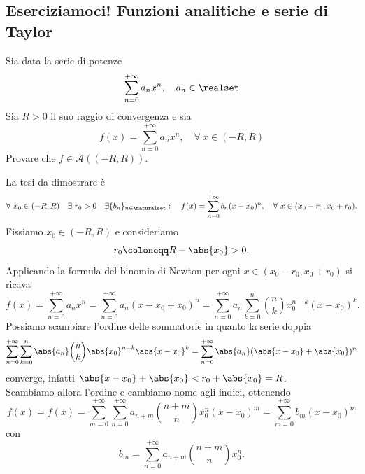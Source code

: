 \subsection{Eserciziamoci! Funzioni analitiche e serie di Taylor}
\begin{exercise}
Sia data la serie di potenze
\begin{equation*}
	\sum_{n=0}^{+\infty} a_n x^n, \quad a_n\in \realset
\end{equation*}
Sia $R>0$ il suo raggio di convergenza e sia
\begin{equation*}
	f(x)=\sum_{n=0}^{+\infty} a_n x^n, \quad \forall \ x\in (-R,R)
\end{equation*}	
Provare che $f\in \mathcal{A}((-R,R))$.
\end{exercise}
\begin{solution}
	La tesi da dimostrare è
	\begin{equation*}
		\forall \ x_0\in (-R,R) \quad \exists \ r_0>0\quad \exists \{b_n\}_{n\in \naturalset}: \quad f(x)=\sum_{n=0}^{+\infty} b_n (x-x_0)^n,\quad \forall \ x\in (x_0-r_0,x_0+r_0).
	\end{equation*}
Fissiamo $x_0\in\left(-R,R\right)$ e consideriamo
\begin{equation*}
	r_0\coloneqq R-\abs{x_0}>0.
\end{equation*}
Applicando la formula del binomio di Newton per ogni $x\in \left(x_0-r_0,x_0+r_0\right)$ si ricava
\begin{equation*}
	f(x)=\sum_{n=0}^{+\infty} a_n x^n=\sum_{n=0}^{+\infty} a_n (x-x_0+x_0)^n = \sum_{n=0}^{+\infty} a_n \sum_{k=0}^{n} \binom{n}{k} x_0^{n-k} (x-x_0)^k.
\end{equation*}
Possiamo scambiare l'ordine delle sommatorie in quanto la serie doppia
\begin{equation*}
	\sum_{n=0}^{+\infty} \sum_{k=0}^{n} \abs{a_n} \binom{n}{k} \abs{x_0}^{n-k} \abs{x-x_0}^k=\sum_{n=0}^{+\infty} \abs{a_n} (\abs{x-x_0}+\abs{x_0})^n
\end{equation*}
converge, infatti $\abs{x-x_0}+\abs{x_0}<r_0+\abs{x_0}=R$.\\
Scambiamo allora l'ordine e cambiamo nome agli indici, ottenendo
\begin{equation*}
	f(x)=f(x)=\sum_{m=0}^{+\infty} \sum_{n=0}^{+\infty} a_{n+m} \binom{n+m}{n} x_0^{n} (x-x_0)^m=\sum_{m=0}^{+\infty} b_m (x-x_0)^m
\end{equation*}
con
\begin{equation*}
	b_m=\sum_{n=0}^{+\infty} a_{n+m} \binom{n+m}{n} x_0^{n}.
\end{equation*}
\end{solution}
